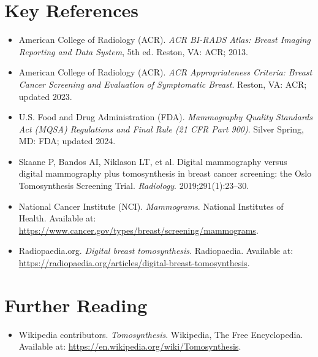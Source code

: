 \section{Key References}
\begin{itemize}
\item American College of Radiology (ACR). \textit{ACR BI-RADS Atlas: Breast Imaging Reporting and Data System}, 5th ed. Reston, VA: ACR; 2013.
\item American College of Radiology (ACR). \textit{ACR Appropriateness Criteria: Breast Cancer Screening and Evaluation of Symptomatic Breast}. Reston, VA: ACR; updated 2023.
\item U.S. Food and Drug Administration (FDA). \textit{Mammography Quality Standards Act (MQSA) Regulations and Final Rule (21 CFR Part 900)}. Silver Spring, MD: FDA; updated 2024.
\item Skaane P, Bandos AI, Niklason LT, et al. Digital mammography versus digital mammography plus tomosynthesis in breast cancer screening: the Oslo Tomosynthesis Screening Trial. \textit{Radiology}. 2019;291(1):23--30.
\item National Cancer Institute (NCI). \textit{Mammograms}. National Institutes of Health. Available at: \url{https://www.cancer.gov/types/breast/screening/mammograms}.
\item Radiopaedia.org. \textit{Digital breast tomosynthesis}. Radiopaedia. Available at: \url{https://radiopaedia.org/articles/digital-breast-tomosynthesis}.
\end{itemize}

\section{Further Reading}
\begin{itemize}
  \item Wikipedia contributors. \textit{Tomosynthesis}. Wikipedia, The Free Encyclopedia. Available at: \url{https://en.wikipedia.org/wiki/Tomosynthesis}.
\end{itemize}
